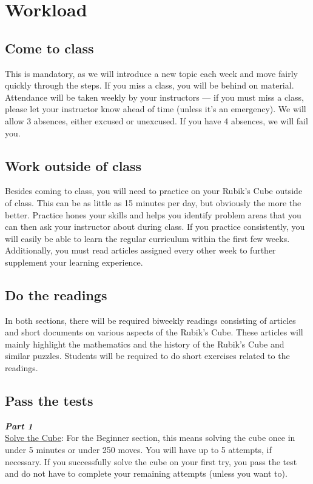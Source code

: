 \documentclass[11pt]{article}
\begin{document}
\section*{Workload}
\subsection*{Come to class}
This is mandatory, as we will introduce a new topic each week and move fairly quickly through the steps. If you miss a class, you will be behind on material. Attendance will be taken weekly by your instructors — if you must miss a class, please let your instructor know ahead of time (unless it’s an emergency). We will allow 3 absences, either excused or unexcused. If you have 4 absences, we will fail you.

\subsection*{Work outside of class}
Besides coming to class, you will need to practice on your Rubik’s Cube outside of class. This can be as little as 15 minutes per day, but obviously the more the better. Practice hones your skills and helps you identify problem areas that you can then ask your instructor about during class. If you practice consistently, you will easily be able to learn the regular curriculum within the first few weeks.  Additionally, you must read articles assigned every other week to further supplement your learning experience.

\subsection*{Do the readings}
In both sections, there will be required biweekly readings consisting of articles and short documents on various aspects of the Rubik’s Cube.  These articles will mainly highlight the mathematics and the history of the Rubik’s Cube and similar puzzles. Students will be required to do short exercises related to the readings.

\subsection*{Pass the tests}
\hspace{\parindent} \textit{\textbf{Part 1}} \\
\underline{Solve the Cube}: For the Beginner section, this means solving the cube once in under 5 minutes or under 250 moves. You will have up to 5 attempts, if necessary. If you successfully solve the cube on your first try, you pass the test and do not have to complete your remaining attempts (unless you want to).
\end{document}
